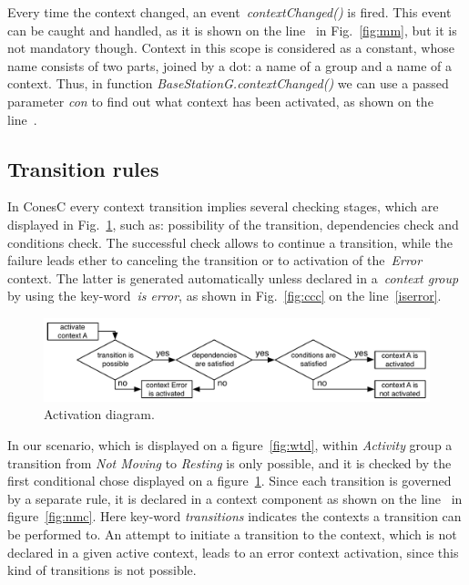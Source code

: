 Every time the context changed, an event~\emph{contextChanged()} is fired. This event can be
caught and handled, as it is shown on the line~ in Fig.~\ref{fig:mm},
but it is not mandatory though. Context in this scope is considered as a constant,
whose name consists of two parts, joined by a dot: a name of a group and a name
of a context. Thus, in function \emph{BaseStationG.contextChanged()} we can use
a passed parameter \emph{con} to find out what context has been activated, as
shown on the line~.

\subsection{Transition rules}\label{subsec:rules}

In ConesC every context transition implies several checking stages, which are displayed in
Fig.~\ref{fig:ad}, such as: possibility of the transition, dependencies check and conditions
check. The successful check allows to continue a transition, while the failure leads ether to
canceling the transition or to activation of the~\emph{Error} context. The latter is generated
automatically unless declared in a~\emph{context group} by using the key-word~\emph{is error},
as shown in Fig.~\ref{fig:ccc} on the line~\ref{iserror}.

\begin{figure}[!h]
\centering
\includegraphics[width=\columnwidth]{pdf/activation_diagram}
\caption{Activation diagram.}
\label{fig:ad}
\end{figure}

In our scenario, which is displayed on a figure~\ref{fig:wtd}, within \emph{Activity} group a
transition from \emph{Not Moving} to \emph{Resting} is only possible, and it is checked
by the first conditional chose displayed on a figure~\ref{fig:ad}.
Since each transition is governed by a separate rule, it is declared in a context component as shown
on the line~ in figure~\ref{fig:nmc}. Here key-word \emph{transitions}
indicates the contexts a transition can be performed to. An attempt to initiate
a transition to the context, which is not declared in a given active context, leads to an error context
activation, since this kind of transitions is not possible.

